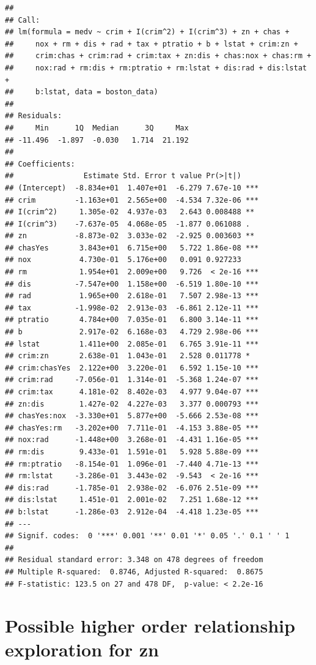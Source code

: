 \documentclass[
]{article}
\begin{document}
\begin{verbatim}
## 
## Call:
## lm(formula = medv ~ crim + I(crim^2) + I(crim^3) + zn + chas + 
##     nox + rm + dis + rad + tax + ptratio + b + lstat + crim:zn + 
##     crim:chas + crim:rad + crim:tax + zn:dis + chas:nox + chas:rm + 
##     nox:rad + rm:dis + rm:ptratio + rm:lstat + dis:rad + dis:lstat + 
##     b:lstat, data = boston_data)
## 
## Residuals:
##     Min      1Q  Median      3Q     Max 
## -11.496  -1.897  -0.030   1.714  21.192 
## 
## Coefficients:
##                Estimate Std. Error t value Pr(>|t|)    
## (Intercept)  -8.834e+01  1.407e+01  -6.279 7.67e-10 ***
## crim         -1.163e+01  2.565e+00  -4.534 7.32e-06 ***
## I(crim^2)     1.305e-02  4.937e-03   2.643 0.008488 ** 
## I(crim^3)    -7.637e-05  4.068e-05  -1.877 0.061088 .  
## zn           -8.873e-02  3.033e-02  -2.925 0.003603 ** 
## chasYes       3.843e+01  6.715e+00   5.722 1.86e-08 ***
## nox           4.730e-01  5.176e+00   0.091 0.927233    
## rm            1.954e+01  2.009e+00   9.726  < 2e-16 ***
## dis          -7.547e+00  1.158e+00  -6.519 1.80e-10 ***
## rad           1.965e+00  2.618e-01   7.507 2.98e-13 ***
## tax          -1.998e-02  2.913e-03  -6.861 2.12e-11 ***
## ptratio       4.784e+00  7.035e-01   6.800 3.14e-11 ***
## b             2.917e-02  6.168e-03   4.729 2.98e-06 ***
## lstat         1.411e+00  2.085e-01   6.765 3.91e-11 ***
## crim:zn       2.638e-01  1.043e-01   2.528 0.011778 *  
## crim:chasYes  2.122e+00  3.220e-01   6.592 1.15e-10 ***
## crim:rad     -7.056e-01  1.314e-01  -5.368 1.24e-07 ***
## crim:tax      4.181e-02  8.402e-03   4.977 9.04e-07 ***
## zn:dis        1.427e-02  4.227e-03   3.377 0.000793 ***
## chasYes:nox  -3.330e+01  5.877e+00  -5.666 2.53e-08 ***
## chasYes:rm   -3.202e+00  7.711e-01  -4.153 3.88e-05 ***
## nox:rad      -1.448e+00  3.268e-01  -4.431 1.16e-05 ***
## rm:dis        9.433e-01  1.591e-01   5.928 5.88e-09 ***
## rm:ptratio   -8.154e-01  1.096e-01  -7.440 4.71e-13 ***
## rm:lstat     -3.286e-01  3.443e-02  -9.543  < 2e-16 ***
## dis:rad      -1.785e-01  2.938e-02  -6.076 2.51e-09 ***
## dis:lstat     1.451e-01  2.001e-02   7.251 1.68e-12 ***
## b:lstat      -1.286e-03  2.912e-04  -4.418 1.23e-05 ***
## ---
## Signif. codes:  0 '***' 0.001 '**' 0.01 '*' 0.05 '.' 0.1 ' ' 1
## 
## Residual standard error: 3.348 on 478 degrees of freedom
## Multiple R-squared:  0.8746, Adjusted R-squared:  0.8675 
## F-statistic: 123.5 on 27 and 478 DF,  p-value: < 2.2e-16
\end{verbatim}

\section{Possible higher order relationship exploration for
zn}\label{possible-higher-order-relationship-exploration-for-zn}
\end{document}
